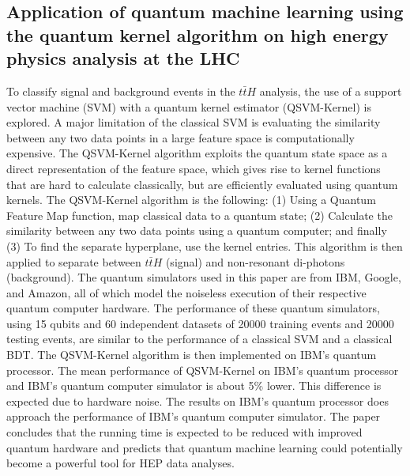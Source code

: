 \subsection{Application of quantum machine learning using the quantum kernel algorithm on high energy physics analysis at the LHC~\cite{Wu:2021xsj}}
To classify signal and background events in the $t\bar{t}H$ analysis, the use of a support vector machine (SVM) with a quantum kernel estimator (QSVM-Kernel) is explored. A major limitation of the classical SVM is evaluating the similarity between any two data points in a large feature space is computationally expensive. The QSVM-Kernel algorithm exploits the quantum state space as a direct representation of the feature space, which gives rise to kernel functions that are hard to calculate classically, but are efficiently evaluated using quantum kernels. The QSVM-Kernel algorithm is the following: (1) Using a Quantum Feature Map function, map classical data to a quantum state; (2) Calculate the similarity between any two data points using a quantum computer; and finally (3) To find the separate hyperplane, use the kernel entries. This algorithm is then applied to separate between $t\bar{t}H$ (signal) and non-resonant di-photons (background). The quantum simulators used in this paper are from IBM, Google, and Amazon, all of which model the noiseless execution of their respective quantum computer hardware. The performance of these quantum simulators, using 15 qubits and 60 independent datasets of 20000 training events and 20000 testing events, are similar to the performance of a classical SVM and a classical BDT. The QSVM-Kernel algorithm is then implemented on IBM's quantum processor. The mean performance of QSVM-Kernel on IBM's quantum processor and IBM's quantum computer simulator is about 5\% lower. This difference is expected due to hardware noise. The results on IBM's quantum processor does approach the performance of IBM's quantum computer simulator. The paper concludes that the running time is expected to be reduced with improved quantum hardware and predicts that quantum machine learning could potentially become a powerful tool for HEP data analyses.
